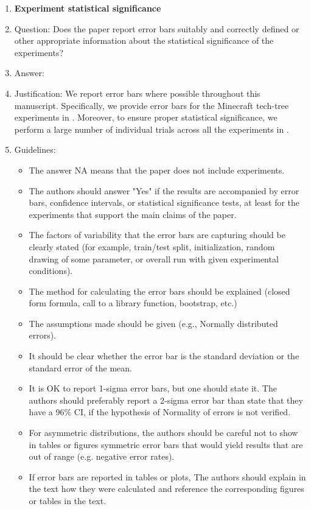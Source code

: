 \documentclass{article}
\begin{document}
\begin{enumerate}
\item {\bf Experiment statistical significance}
    \item[] Question: Does the paper report error bars suitably and correctly defined or other appropriate information about the statistical significance of the experiments?
    \item[] Answer: \answerYes{}
    \item[] Justification: We report error bars where possible throughout this manuscript. Specifically, we provide error bars for the Minecraft tech-tree experiments in . Moreover, to ensure proper statistical significance, we perform a large number of individual trials across all the experiments in .
    \item[] Guidelines:
    \begin{itemize}
        \item The answer NA means that the paper does not include experiments.
        \item The authors should answer "Yes" if the results are accompanied by error bars, confidence intervals, or statistical significance tests, at least for the experiments that support the main claims of the paper.
        \item The factors of variability that the error bars are capturing should be clearly stated (for example, train/test split, initialization, random drawing of some parameter, or overall run with given experimental conditions).
        \item The method for calculating the error bars should be explained (closed form formula, call to a library function, bootstrap, etc.)
        \item The assumptions made should be given (e.g., Normally distributed errors).
        \item It should be clear whether the error bar is the standard deviation or the standard error of the mean.
        \item It is OK to report 1-sigma error bars, but one should state it. The authors should preferably report a 2-sigma error bar than state that they have a 96\% CI, if the hypothesis of Normality of errors is not verified.
        \item For asymmetric distributions, the authors should be careful not to show in tables or figures symmetric error bars that would yield results that are out of range (e.g. negative error rates).
        \item If error bars are reported in tables or plots, The authors should explain in the text how they were calculated and reference the corresponding figures or tables in the text.
    \end{itemize}


\end{enumerate}
\end{document}
